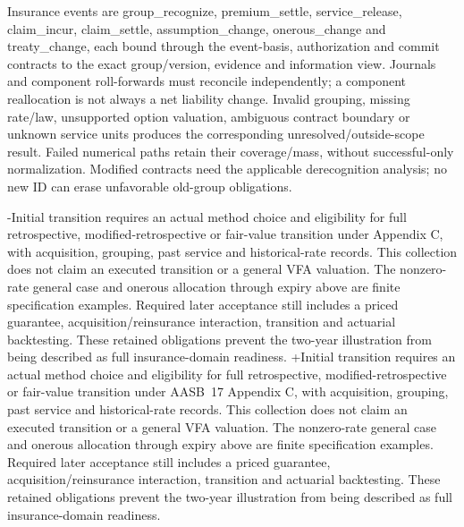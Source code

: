  Insurance events are group\_recognize, premium\_settle, service\_release, claim\_incur, claim\_settle, assumption\_change, onerous\_change and treaty\_change, each bound through the event-basis, authorization and commit contracts to the exact group/version, evidence and information view. Journals and component roll-forwards must reconcile independently; a component reallocation is not always a net liability change. Invalid grouping, missing rate/law, unsupported option valuation, ambiguous contract boundary or unknown service units produces the corresponding unresolved/outside-scope result. Failed numerical paths retain their coverage/mass, without successful-only normalization. Modified contracts need the applicable derecognition analysis; no new ID can erase unfavorable old-group obligations.
 
-Initial transition requires an actual method choice and eligibility for full retrospective, modified-retrospective or fair-value transition under Appendix C, with acquisition, grouping, past service and historical-rate records. This collection does not claim an executed transition or a general VFA valuation. The nonzero-rate general case and onerous allocation through expiry above are finite specification examples. Required later acceptance still includes a priced guarantee, acquisition/reinsurance interaction, transition and actuarial backtesting. These retained obligations prevent the two-year illustration from being described as full insurance-domain readiness.
+Initial transition requires an actual method choice and eligibility for full retrospective, modified-retrospective or fair-value transition under AASB~17 Appendix C, with acquisition, grouping, past service and historical-rate records. This collection does not claim an executed transition or a general VFA valuation. The nonzero-rate general case and onerous allocation through expiry above are finite specification examples. Required later acceptance still includes a priced guarantee, acquisition/reinsurance interaction, transition and actuarial backtesting. These retained obligations prevent the two-year illustration from being described as full insurance-domain readiness.
